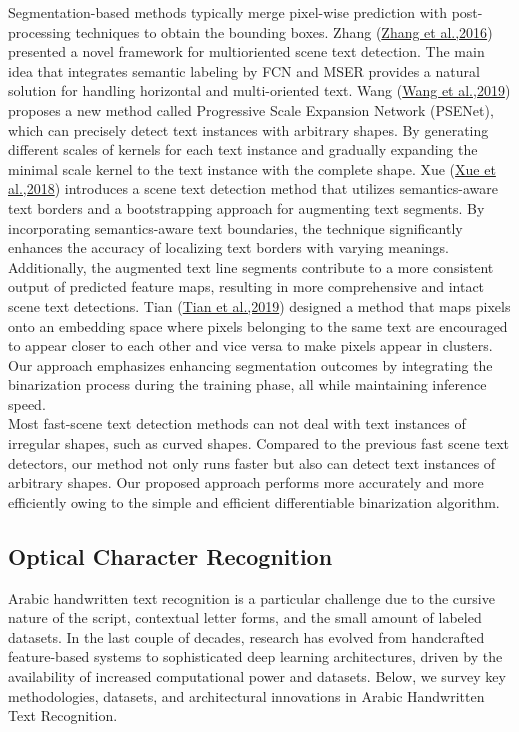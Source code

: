 Segmentation-based methods typically merge pixel-wise prediction with post-processing techniques to obtain the bounding boxes. Zhang (\hyperref[Zhang2016]{Zhang et al.,2016}) presented a novel framework for multioriented scene text detection. The main idea that integrates semantic labeling by FCN and MSER provides a natural solution for handling horizontal and multi-oriented text. Wang (\hyperref[Wang2019]{Wang et al.,2019}) proposes a new method called Progressive Scale Expansion Network (PSENet), which can precisely detect text instances with arbitrary shapes. By generating different scales of kernels for each text instance and gradually expanding the minimal scale kernel to the text instance with the complete shape. Xue (\hyperref[Xue2018]{Xue et al.,2018}) introduces a scene text detection method that utilizes semantics-aware text borders and a bootstrapping approach for augmenting text segments. By incorporating semantics-aware text boundaries, the technique significantly enhances the accuracy of localizing text borders with varying meanings. Additionally, the augmented text line segments contribute to a more consistent output of predicted feature maps, resulting in more comprehensive and intact scene text detections. Tian (\hyperref[Tian2019]{Tian et al.,2019}) designed a method that maps pixels onto an embedding space where pixels belonging to the same text are encouraged to appear closer to each other and vice versa to make pixels appear in clusters. Our approach emphasizes enhancing segmentation outcomes by integrating the binarization process during the training phase, all while maintaining inference speed.\\
Most fast-scene text detection methods can not deal with text instances of irregular shapes,
such as curved shapes. Compared to the previous fast scene text detectors, our method not only runs faster but also can detect text instances of arbitrary shapes. Our proposed approach performs more accurately and more efficiently owing to the simple and efficient differentiable binarization algorithm.



\subsection{Optical Character Recognition}
Arabic handwritten text recognition is a particular challenge due to the cursive nature of the script, contextual letter forms, and the small amount of labeled datasets. In the last couple of decades, research has evolved from handcrafted feature-based systems to sophisticated deep learning architectures, driven by the availability of increased computational power and datasets. Below, we survey key methodologies, datasets, and architectural innovations in Arabic Handwritten Text Recognition.


